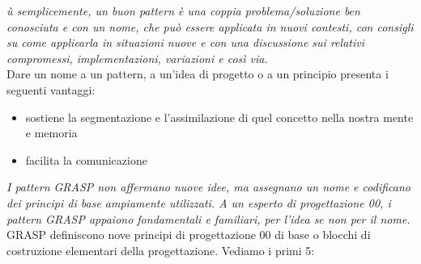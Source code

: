 \documentclass[a4paper,12pt, oneside]{book}
\begin{document}
\textit{ù semplicemente, un buon pattern è una coppia problema/soluzione ben conosciuta
e con un nome, che può essere applicata in nuovi contesti, con consigli su come
applicarla in situazioni nuove e con una discussione sui relativi compromessi,
implementazioni, variazioni e così via.}\\
Dare un nome a un pattern, a un'idea di progetto o a un principio presenta i seguenti vantaggi:
\begin{itemize}
\item sostiene la segmentazione e l'assimilazione di quel concetto nella nostra mente e
memoria
\item facilita la comunicazione
\end{itemize}
\textit{I pattern GRASP non affermano nuove idee, ma assegnano un nome e
codificano dei principi di base ampiamente utilizzati. A un esperto di progettazione 00, i
pattern GRASP appaiono fondamentali e familiari, per l'idea se non per il nome.}\\
GRASP definiscono nove principi di progettazione 00 di base o blocchi di costruzione elementari della progettazione. Vediamo i primi 5:
\end{document}
